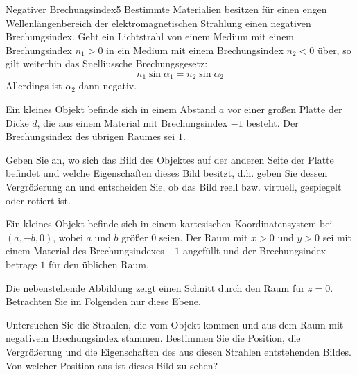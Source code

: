 \begin{problem}{Negativer Brechungsindex}{5}
Bestimmte Materialien besitzen für einen engen Wellenlängenbereich der elektromagnetischen Strahlung einen negativen Brechungsindex.  Geht ein Lichtstrahl von einem Medium mit einem Brechungsindex $n_1>0$ in ein Medium mit einem Brechungsindex $n_2<0$ über, so gilt weiterhin das Snelliussche Brechungsgesetz:
\begin{equation*}
  n_1\sin{\alpha_1}=n_2\sin{\alpha_2}
\end{equation*}
Allerdings ist $\alpha_2$ dann negativ.
\begin{abcenum}
  \item Ein kleines Objekt befinde sich in einem Abstand $a$ vor einer großen Platte der Dicke $d$, die aus einem Material mit Brechungsindex $-1$ besteht.  Der Brechungsindex des übrigen Raumes sei $1$.

Geben Sie an, wo sich das Bild des Objektes auf der anderen Seite der Platte befindet und welche Eigenschaften dieses Bild besitzt, d.h. geben Sie dessen Vergrößerung an und entscheiden Sie, ob das Bild reell bzw. virtuell, gespiegelt oder rotiert ist.
  \item Ein kleines Objekt befinde sich in einem kartesischen Koordinatensystem bei $(a,-b,0)$, wobei $a$ und $b$ größer $0$ seien.  Der Raum mit $x>0$ und $y>0$ sei mit einem Material des Brechungsindexes $-1$ angefüllt und der Brechungsindex betrage $1$ für den üblichen Raum.

Die nebenstehende Abbildung zeigt einen Schnitt durch den Raum für $z=0$.  Betrachten Sie im Folgenden nur diese Ebene.

Untersuchen Sie die Strahlen, die vom Objekt kommen und aus dem Raum mit negativem Brechungsindex stammen.  Bestimmen Sie die Position, die Vergrößerung und die Eigenschaften des aus diesen Strahlen entstehenden Bildes.  Von welcher Position aus ist dieses Bild zu sehen?
\end{abcenum}
  \begin{solution}
    
  \end{solution}
\end{problem}

